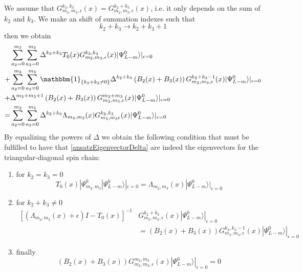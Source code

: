 \documentclass[11pt]{article}
\numberwithin{equation}{section}
\numberwithin{equation}{subsection}
\begin{document}
We assume that $G_{m_{2},m_{3},\epsilon}^{k_{2},k_{3}}(x)=G_{m_{2},m_{3},\epsilon}^{k_{2}+k_{3}}(x)$, i.e. it only depends on the sum of $k_{2}$ and $k_{3}$. We make an shift of summation indexes such that 
\begin{equation}
k_{2}+k_{3}\to k_{2}+k_{3}+1
\end{equation}
then we obtain
\begin{align*}
&\sum_{a_{2}=0}^{m_{2}}\sum_{a_{3}=0}^{m_{3}}\Delta^{k_{2}+k_{3}}T_{0}(x)G_{m_{2},m_{3},\epsilon}^{k_{2},k_{3}}(x) |\Psi_{L-m}^{0}\rangle|_{\epsilon=0}
\\+&
\sum_{a_{2}=0}^{m_{2}}\sum_{a_{3}=0}^{m_{3}}\mathbbm{1}_{\{k_{2}+k_{3}\neq 0\}}\Delta^{k_{2}+k_{3}}\left(B_{2}(x)+B_{3}(x)\right)G_{m_{2},m_{3},\epsilon}^{k_{2}+k_{3}-1}(x)|\Psi_{L-m}^{0}\rangle|_{\epsilon=0}
\\+&
\Delta^{m_{2}+m_{3}+1}\left(B_{2}(x)+B_{3}(x)\right)G_{m_{2},m_{3},\epsilon}^{m_{2}+m_{3}}(x)|\Psi_{L-m}^{0}\rangle|_{\epsilon=0}
\\=&
\sum_{a_{2}=0}^{m_{2}}\sum_{a_{3}=0}^{m_{3}}\Delta^{k_{2}+k_{3}}\Lambda_{m_{2},m_{3}}(x)G_{m_{2},m_{3}\epsilon}^{k_{2},k_{3}}(x)|\Psi_{L-m}^{0}\rangle|_{\epsilon=0}
\end{align*}
By equalizing the powers of $\Delta$ we obtain the following condition that must be fulfilled to have that \eqref{ansatzEigenvectorDelta} are indeed the eigenvectors for the triangular-diagonal spin chain:
\begin{enumerate}
\item for $k_{2}=k_{3}=0$
\begin{equation}\label{condition1}
T_{0}(x)|\Psi_{m_{2},m_{3}}^{0}|\Psi_{L-m}^{0}\rangle|_{\epsilon=0}=\Lambda_{m_{2},m_{3}}(x)|\Psi_{L-m}^{0}\rangle|_{\epsilon=0}
\end{equation}
\item for $k_{2}+k_{3}\neq 0$
\begin{equation}\label{condition2}
\begin{split}
\left[\left(\Lambda_{m_{2},m_{3}}(x)+\epsilon\right)I-T_{0}(x)\right]^{-1}&G_{m_{2},m_{3},\epsilon}^{k_{2}+k_{3}}(x)|\Psi_{L-m}^{0}\rangle|_{\epsilon=0}\\&=\left(B_{2}(x)+B_{3}(x)\right)G_{m_{2},m_{3},\epsilon}^{k_{2},k_{3}-1}(x)|\Psi_{L-m}^{0}\rangle|_{\epsilon=0}
\end{split}
\end{equation}
\item finally
\begin{equation}\label{condition3}
\left(B_{2}(x)+B_{3}(x)\right)G_{m_{2},m_{3},\epsilon}^{m_{2},m_{3}}(x)|\Psi_{L-m}^{0}\rangle|_{\epsilon=0}=0
\end{equation}
\end{enumerate}
\end{document}
